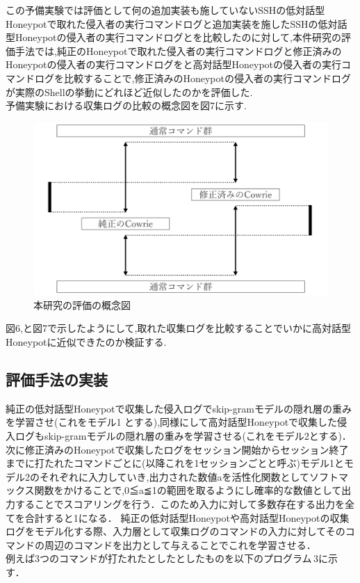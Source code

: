 この予備実験では評価として何の追加実装も施していないSSHの低対話型Honeypotで取れた侵入者の実行コマンドログと追加実装を施したSSHの低対話型Honeypotの侵入者の実行コマンドログとを比較したのに対して,本件研究の評価手法では,純正のHoneypotで取れた侵入者の実行コマンドログと修正済みのHoneypotの侵入者の実行コマンドログをと高対話型Honeypotの侵入者の実行コマンドログを比較することで,修正済みのHoneypotの侵入者の実行コマンドログが実際のShellの挙動にどれほど近似したのかを評価した.\\
予備実験における収集ログの比較の概念図を図7に示す.

\begin{figure}[H]
    \centering
    \includegraphics[width=1.0\textwidth]{figures/sotuhyoka.png}
    \caption{本研究の評価の概念図}
    \label{fig:evo}
\end{figure}

図6,と図7で示したようにして,取れた収集ログを比較することでいかに高対話型Honeypotに近似できたのか検証する.


\subsection{評価手法の実装}
\label{evaluation:impl}
純正の低対話型Honeypotで収集した侵入ログでskip-gramモデルの隠れ層の重みを学習させ(これをモデル1
とする),同様にして高対話型Honeypotで収集した侵入ログもskip-gramモデルの隠れ層の重みを学習させる(これをモデル2とする)．次に修正済みのHoneypotで収集したログをセッション開始からセッション終了までに打たれたコマンドごとに(以降これを1セッションごとと呼ぶ)モデル1とモデル2のそれぞれに入力していき,出力された数値aを活性化関数としてソフトマックス関数をかけることで,0≦a≦1の範囲を取るようにし確率的な数値として出力することでスコアリングを行う．このため入力に対して多数存在する出力を全てを合計すると1になる．
純正の低対話型Honeypotや高対話型Honeypotの収集ログをモデル化する際、入力層として収集ログのコマンドの入力に対してそのコマンドの周辺のコマンドを出力として与えることでこれを学習させる．\\
例えば3つのコマンドが打たれたとしたとしたものを以下のプログラム\,3に示す．

